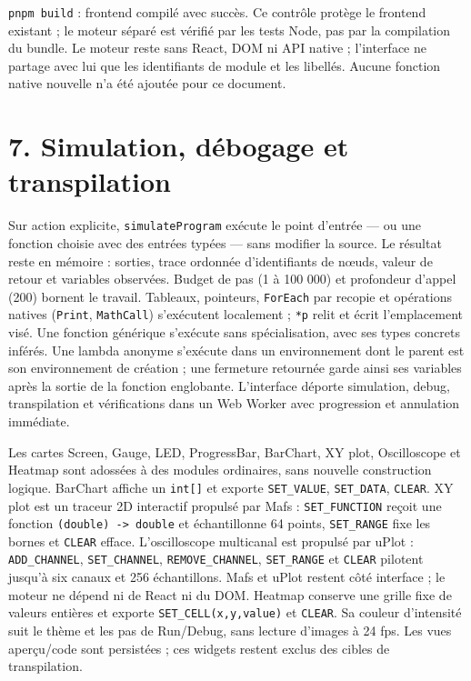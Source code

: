 \documentclass[11pt,a4paper]{article}
\newcommand{\code}[1]{\texttt{#1}}
\begin{document}
\code{pnpm build} : frontend compilé avec succès. Ce contrôle protège le
frontend existant ; le moteur séparé est vérifié par les tests Node, pas par
la compilation du bundle. Le moteur reste sans React, DOM ni API native ;
l'interface ne partage avec lui que les identifiants de module et les libellés.
Aucune fonction native nouvelle n'a été ajoutée pour ce document.

\section*{7. Simulation, débogage et transpilation}
Sur action explicite, \code{simulateProgram} exécute le point d'entrée — ou une
fonction choisie avec des entrées typées — sans modifier la source. Le résultat
reste en mémoire : sorties, trace ordonnée d'identifiants de nœuds, valeur de
retour et variables observées. Budget de pas (1 à 100 000) et profondeur
d'appel (200) bornent le travail. Tableaux, pointeurs, \code{ForEach} par
recopie et opérations natives (\code{Print}, \code{MathCall}) s'exécutent
localement ; \code{*p} relit et écrit l'emplacement visé. Une fonction générique
s'exécute sans spécialisation, avec ses types concrets inférés. Une lambda
anonyme s'exécute dans un environnement dont le parent est son environnement de
création ; une fermeture retournée garde ainsi ses variables après la sortie de
la fonction englobante. L'interface déporte simulation, debug, transpilation et
vérifications dans un Web Worker avec progression et annulation immédiate.

Les cartes Screen, Gauge, LED, ProgressBar, BarChart, XY plot, Oscilloscope et Heatmap sont adossées à
des modules ordinaires, sans nouvelle construction logique. BarChart affiche
un \code{int[]} et exporte \code{SET\_VALUE}, \code{SET\_DATA}, \code{CLEAR}.
XY plot est un traceur 2D interactif propulsé par Mafs : \code{SET\_FUNCTION}
reçoit une fonction \code{(double) -> double} et échantillonne 64 points,
\code{SET\_RANGE} fixe les bornes et \code{CLEAR} efface. L'oscilloscope
multicanal est propulsé par uPlot : \code{ADD\_CHANNEL}, \code{SET\_CHANNEL},
\code{REMOVE\_CHANNEL}, \code{SET\_RANGE} et \code{CLEAR} pilotent jusqu'à six
canaux et 256 échantillons. Mafs et uPlot restent côté interface ; le moteur ne
dépend ni de React ni du DOM. Heatmap conserve une grille fixe de valeurs entières et exporte
\code{SET\_CELL(x,y,value)} et \code{CLEAR}. Sa couleur d'intensité suit le
thème et les pas de Run/Debug, sans lecture d'images à 24 fps. Les vues aperçu/code
sont persistées ; ces widgets restent exclus des cibles de transpilation.
\end{document}
